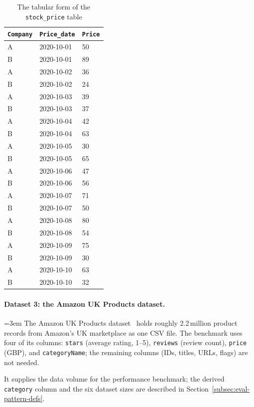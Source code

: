 \begin{table}[H]
  \centering
  \caption[Stock price table]{The tabular form of the \texttt{stock\_price} table}
  \label{tab:stock_price}
  \begin{tabular}{@{}lll@{}}
    \toprule
    \texttt{Company} & \texttt{Price\_date} & \texttt{Price} \\
    \midrule
    A & 2020-10-01 & 50 \\
    B & 2020-10-01 & 89 \\
    A & 2020-10-02 & 36 \\
    B & 2020-10-02 & 24 \\
    A & 2020-10-03 & 39 \\
    B & 2020-10-03 & 37 \\
    A & 2020-10-04 & 42 \\
    B & 2020-10-04 & 63 \\
    A & 2020-10-05 & 30 \\
    B & 2020-10-05 & 65 \\
    A & 2020-10-06 & 47 \\
    B & 2020-10-06 & 56 \\
    A & 2020-10-07 & 71 \\
    B & 2020-10-07 & 50 \\
    A & 2020-10-08 & 80 \\
    B & 2020-10-08 & 54 \\
    A & 2020-10-09 & 75 \\
    B & 2020-10-09 & 30 \\
    A & 2020-10-10 & 63 \\
    B & 2020-10-10 & 32 \\
    \bottomrule
  \end{tabular}
\end{table}

\paragraph{Dataset 3: the Amazon UK Products dataset.}
\begingroup\emergencystretch=3em
The Amazon UK Products dataset~\cite{asaniczka2023amazon} holds
roughly 2.2\,million product records from Amazon's UK marketplace as
one CSV file.  The benchmark uses four of its columns:
\texttt{stars} (average rating, 1--5), \texttt{reviews} (review
count), \texttt{price} (GBP), and \texttt{categoryName}; the
remaining columns (IDs, titles, URLs, flags) are not needed.\par\endgroup
It
supplies the data volume for the performance benchmark; the derived
\texttt{category} column and the six dataset sizes are described in
Section~\ref{subsec:eval-pattern-defs}.

